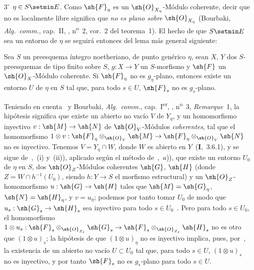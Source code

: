$3^\circ$ $\eta\in S\setmin E$.
Como $\sh{F}_\eta$ es un $\sh{O}_{X_\eta}$-Módulo coherente, decir que no es localmente libre significa que \emph{no es plano sobre} $\sh{O}_{X_\eta}$ (Bourbaki, \emph{Alg.\ comm.}, cap.~II, , n\textsuperscript{o}~2, cor.~2 del teorema~1).
El hecho de que $S\setmin E$ sea un entorno de $\eta$ se seguirá entonces del lema más general siguiente:

\begin{lemma}[9.4.7.1]
\label{IV.9.4.7.1}
Sea $S$ un preesquema íntegro noetheriano, de punto genérico $\eta$, sean $X$, $Y$ dos $S$-preesquemas de tipo finito sobre $S$, $g:X\to Y$ un $S$-morfismo y $\sh{F}$ un $\sh{O}_X$-Módulo coherente.
Si $\sh{F}_\eta$ no es $g_\eta$-plano, entonces existe un entorno $U$ de $\eta$ en $S$ tal que, para todo $s\in U$, $\sh{F}_s$ no es $g_s$-plano.
\end{lemma}

Teniendo en cuenta~ y Bourbaki, \emph{Alg.\ comm.}, cap.~I\textsuperscript{er}, , n\textsuperscript{o}~3, \emph{Remarque}~1, la hipótesis significa que existe un abierto no vacío $V$ de $Y_\eta$, y un homomorfismo inyectivo $v:\sh{M}\to\sh{N}$ de $\sh{O}_V$-Módulos \emph{coherentes}, tal que el homomorfismo $1\otimes v:\sh{F}_\eta\otimes_{\sh{O}_V}\sh{M}\to\sh{F}_\eta\otimes_{\sh{O}_V}\sh{N}$ no es inyectivo.
Tenemos $V=Y_\eta\cap W$, donde $W$ es abierto en $Y$~(\textbf{I},~3.6.1), y se sigue de~,~(i) y~(ii)), aplicado según el método de~,~$a$)), que existe un entorno $U_0$ de $\eta$ en $S$, dos $\sh{O}_Z$-Módulos
coherentes $\sh{G}$, $\sh{H}$ (donde $Z=W\cap h^{-1}(U_0)$, siendo $h:Y\to S$ el morfismo estructural) y un $\sh{O}_Z$-homomorfismo $u:\sh{G}\to\sh{H}$ tales que $\sh{M}=\sh{G}_\eta$, $\sh{N}=\sh{H}_\eta$, y $v=u_\eta$; podemos por tanto tomar $U_0$ de modo que $u_s:\sh{G}_s\to\sh{H}_s$ sea inyectivo para todo $s\in U_0$~.
Pero para todo $s\in U_0$, el homomorfismo $1\otimes u_s:\sh{F}_s\otimes_{\sh{O}_{Z_s}}\sh{G}_s\to\sh{F}_s\otimes_{\sh{O}_{Z_s}}\sh{H}_s$ no es otro que $(1\otimes u)_s$; la hipótesis de que $(1\otimes u)_\eta$ no es inyectivo implica, pues, por~, la existencia de un abierto no vacío $U\subset U_0$ tal que, para todo $s\in U$, $(1\otimes u)_s$ no es inyectivo, y por tanto $\sh{F}_s$ no es $g_s$-plano para todo $s\in U$.

